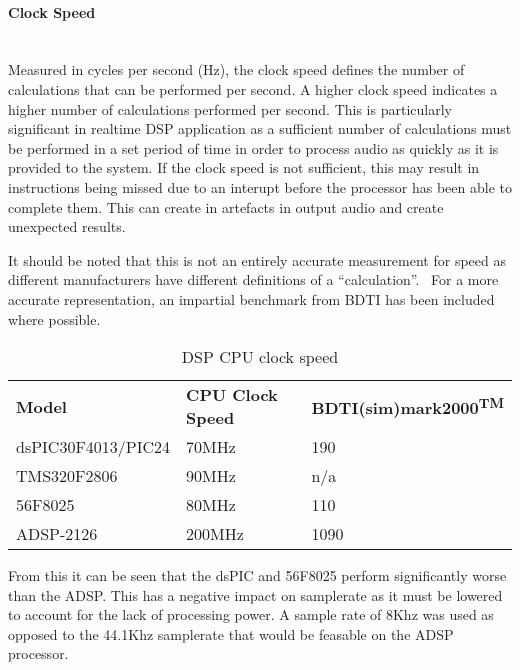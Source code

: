\documentclass[titlepage]{scrartcl}
\begin{document}
    \paragraph{Clock Speed}~\\
    Measured in cycles per second (Hz), the clock speed defines the number of
    calculations that can be performed per second. A higher clock speed
    indicates a higher number of calculations performed per second. This is
    particularly significant in realtime DSP application as a sufficient number
    of calculations must be performed in a set period of time in order to
    process audio as quickly as it is provided to the system.  If the clock
    speed is not sufficient, this may result in instructions being missed due
    to an interupt before the processor has been able to complete them. This
    can create in artefacts in output audio and create unexpected results.

    It should be noted that this is not an entirely accurate measurement for
    speed as different manufacturers have different definitions of a
    ``calculation''.~\parencite[p.3-4]{bdti2000cdp} For a more accurate
    representation, an impartial benchmark from BDTI has been included where
    possible.~\parencite[p.1]{bdti2013pg}
    \begin{table}[H]
    \centering
    \caption{DSP CPU clock speed}
    \label{my-label}
    \begin{tabular}{lll}
        \textbf{Model}              & \textbf{CPU Clock Speed}
                                    &\textbf{BDTI(sim)mark2000\textsuperscript{TM}}\\
        dsPIC30F4013/PIC24 & 70MHz              & 190\\
        TMS320F2806        & 90MHz              & n/a\\
        56F8025            & 80MHz              & 110\\
        ADSP-2126          & 200MHz             & 1090\\
    \end{tabular}
    \end{table}
    From this it can be seen that the dsPIC and 56F8025 perform significantly
    worse than the ADSP. This has a negative impact on samplerate as it must be
    lowered to account for the lack of processing power. A sample rate of 8Khz
    was used as opposed to the 44.1Khz samplerate that would be feasable on the
    ADSP processor.
\end{document}
